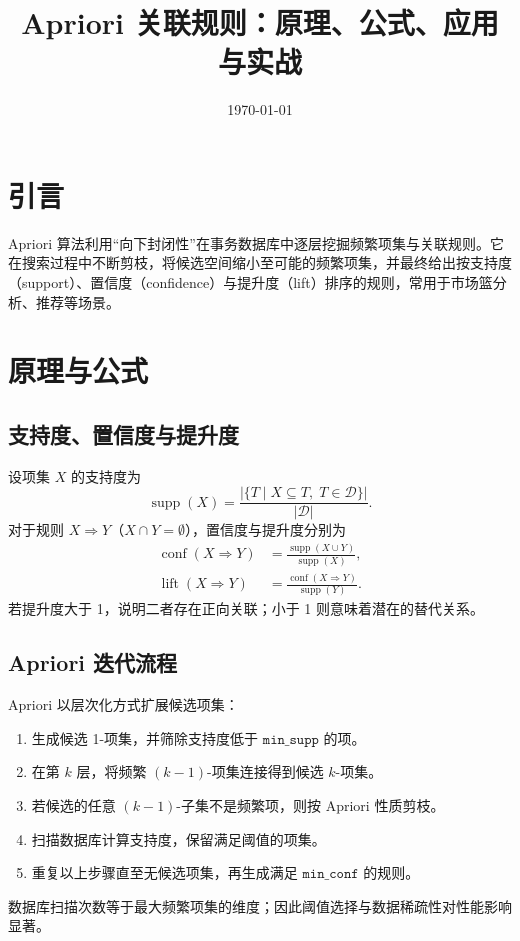 \documentclass[UTF8,zihao=-4]{ctexart}
\title{Apriori 关联规则：原理、公式、应用与实战}
\author{}
\date{\today}
\begin{document}
\maketitle

\section{引言}
Apriori 算法利用“向下封闭性”在事务数据库中逐层挖掘频繁项集与关联规则。它在搜索过程中不断剪枝，将候选空间缩小至可能的频繁项集，并最终给出按支持度（support）、置信度（confidence）与提升度（lift）排序的规则，常用于市场篮分析、推荐等场景。

\section{原理与公式}
\subsection{支持度、置信度与提升度}
设项集 \(X\) 的支持度为
\begin{equation}
\operatorname{supp}(X) = \frac{\left|\{ T \mid X \subseteq T,\; T \in \mathcal{D}\}\right|}{|\mathcal{D}|}.
\end{equation}
对于规则 \(X \Rightarrow Y\)（\(X \cap Y = \emptyset\)），置信度与提升度分别为
\begin{align}
\operatorname{conf}(X \Rightarrow Y) &= \frac{\operatorname{supp}(X \cup Y)}{\operatorname{supp}(X)},\\
\operatorname{lift}(X \Rightarrow Y) &= \frac{\operatorname{conf}(X \Rightarrow Y)}{\operatorname{supp}(Y)}.
\end{align}
若提升度大于 1，说明二者存在正向关联；小于 1 则意味着潜在的替代关系。

\subsection{Apriori 迭代流程}
Apriori 以层次化方式扩展候选项集：
\begin{enumerate}
  \item 生成候选 1-项集，并筛除支持度低于 \(\texttt{min\_supp}\) 的项。
  \item 在第 \(k\) 层，将频繁 \((k-1)\)-项集连接得到候选 \(k\)-项集。
  \item 若候选的任意 \((k-1)\)-子集不是频繁项，则按 Apriori 性质剪枝。
  \item 扫描数据库计算支持度，保留满足阈值的项集。
  \item 重复以上步骤直至无候选项集，再生成满足 \(\texttt{min\_conf}\) 的规则。
\end{enumerate}
数据库扫描次数等于最大频繁项集的维度；因此阈值选择与数据稀疏性对性能影响显著。
\end{document}
